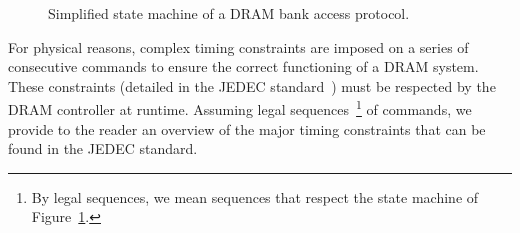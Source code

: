 \documentclass[main.tex]{subfiles}
\begin{document}
\begin{figure}
    \centering
    \scalebox{0.8}{}
    \caption{Simplified state machine of a DRAM bank access protocol.}
    \label{fig_stateOfTheArt_DRAMstateMachine}
\end{figure}

For physical reasons, complex timing constraints are imposed on a series of
consecutive commands to ensure the correct functioning of a DRAM system. These
constraints (detailed in the JEDEC standard~\cite{JEDEC2012}) must be respected
by the DRAM controller at runtime. Assuming legal sequences~\footnote{By legal
sequences, we mean sequences that respect the state machine of
Figure~\ref{fig_stateOfTheArt_DRAMstateMachine}.} of commands, we provide to
the reader an overview of the major timing constraints that can be found in the
JEDEC standard.
\end{document}
